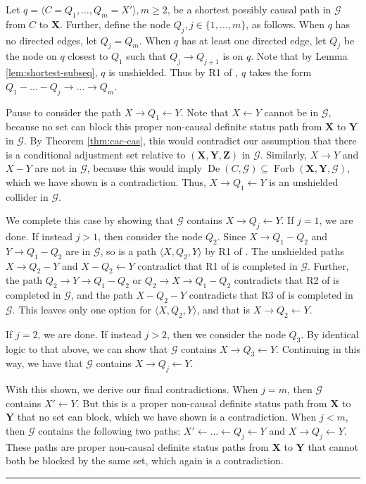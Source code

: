 \documentclass[twoside]{article}
\DeclareMathOperator{\De}{De}
\DeclareMathOperator{\Forb}{Forb}
\newcommand{\fb}[2][X,Y]{\Forb(\mb{#1},#2)}
\newcommand{\mb}[1]{\mathbf{#1}}
\newcommand{\g}[1][G]{\mathcal{#1}}
\newenvironment{proofof}[1][]{\begin{trivlist}
\item[\hskip \labelsep {\bfseries Proof of #1.}]}{\hfill\BlackBox\end{trivlist}}
\newcommand{\BlackBox}{\rule{1.5ex}{1.5ex}}
\begin{document}
\begin{proofof}[Theorem \ref{thm:adjust-and-o}]
\begin{enumerate}[label = (\arabic*)]
            Let $q = \langle C = Q_1, \dots, Q_m= X'\rangle, m \ge 2$, be a shortest possibly causal path in $\g$ from $C$ to $\mb{X}$. Further, define the node $Q_j, j \in \{1, \dots, m\}$, as follows. When $q$ has no directed edges, let $Q_j = Q_m$. When $q$ has at least one directed edge, let $Q_j$ be the node on $q$ closest to $Q_1$ such that $Q_j \to Q_{j+1}$ is on $q$. Note that by Lemma \ref{lem:shortest-subseq}, $q$ is unshielded. Thus by R1 of \cite{meek1995causal}, $q$ takes the form $Q_1 - \dots - Q_j \to \dots \to Q_m$.

            Pause to consider the path $X \to Q_1 \gets Y$. Note that $X \gets Y$ cannot be in $\g$, because no set can block this proper non-causal definite status path from $\mb{X}$ to $\mb{Y}$ in $\g$. By Theorem \ref{thm:cac-cas}, this would contradict our assumption that there is a conditional adjustment set relative to $(\mb{X,Y,Z})$ in $\g$. Similarly, $X \to Y$ and $X - Y$ are not in $\g$, because this would imply $\De(C,\g) \subseteq \fb{\g}$, which we have shown is a contradiction. Thus, $X \to Q_1 \gets Y$ is an unshielded collider in $\g$.

            We complete this case by showing that $\g$ contains $X \to Q_j \gets Y$. If $j=1$, we are done. If instead $j>1$, then consider the node $Q_2$. Since $X \to Q_1 - Q_2$ and $Y \to Q_1 - Q_2$ are in $\g$, so is a path $\langle X,Q_2, Y \rangle$ by R1 of \cite{meek1995causal}. The unshielded paths $X \to Q_2 - Y$ and $X - Q_2 \leftarrow Y$ contradict that R1 of \cite{meek1995causal} is completed in $\g$. Further, the path $Q_2 \to Y \to Q_1 - Q_2$ or $Q_2 \to X \to Q_1 - Q_2$ contradicts that R2 of \cite{meek1995causal} is completed in $\g$, and the path $X - Q_2 - Y$ contradicts that R3 of \cite{meek1995causal} is completed in $\g$. This leaves only one option for $\langle X,Q_2, Y \rangle$, and that is $X \to Q_2 \leftarrow Y$.

            If $j=2$, we are done. If instead $j>2$, then we consider the node $Q_3$. By identical logic to that above, we can show that $\g$ contains $X \to Q_3 \gets Y$. Continuing in this way, we have that $\g$ contains $X \to Q_j \gets Y$.

            With this shown, we derive our final contradictions. When $j=m$, then $\g$ contains $X' \gets Y$. But this is a proper non-causal definite status path from $\mb{X}$ to $\mb{Y}$ that no set can block, which we have shown is a contradiction. When $j<m$, then $\g$ contains the following two paths: $X' \gets \dots \gets Q_j \gets Y$ and $X \to Q_j \leftarrow Y$. These paths are proper non-causal definite status paths from $\mb{X}$ to $\mb{Y}$ that cannot both be blocked by the same set, which again is a contradiction.
        \end{enumerate}
        

\end{proofof}
\end{document}
